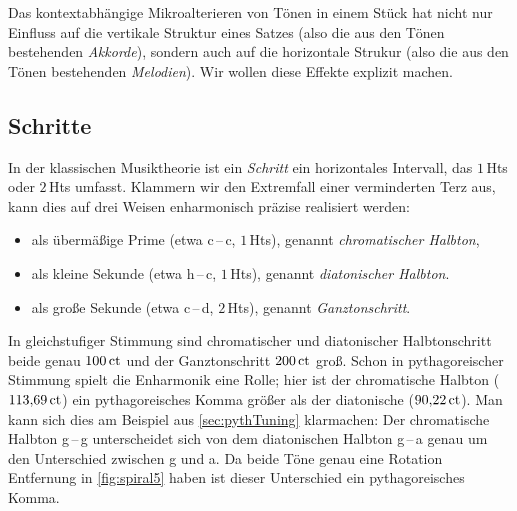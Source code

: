 Das kontextabhängige Mikroalterieren von Tönen in einem Stück hat nicht nur
Einfluss auf die vertikale Struktur eines Satzes (also die aus den Tönen
bestehenden \emph{Akkorde}), sondern auch auf die horizontale Strukur (also die
aus den Tönen bestehenden \emph{Melodien}). Wir wollen diese Effekte explizit
machen.

\subsection{Schritte}
\label{sec:steps}

In der klassischen Musiktheorie ist ein \emph{Schritt} ein horizontales
Intervall, das $1$\,Hts oder $2$\,Hts umfasst.  Klammern wir den Extremfall einer verminderten Terz aus, kann
dies auf drei Weisen enharmonisch präzise realisiert werden:
\begin{itemize}[itemsep=0em]
\item als übermäßige Prime (etwa c\,–\,\sharp c, $1$\,Hts), genannt
  \emph{chromatischer Halbton},
\item als kleine Sekunde (etwa h\,–\,c, $1$\,Hts), genannt
  \emph{diatonischer Halbton}.
\item als große Sekunde (etwa c\,–\,d, $2$\,Hts), genannt
  \emph{Ganztonschritt}.
\end{itemize}
In gleichstufiger Stimmung sind chromatischer und diatonischer Halbtonschritt
beide genau $100\,\text{ct}$ und der Ganztonschritt $200\,\text{ct}$ groß.  Schon in
pythagoreischer Stimmung spielt die Enharmonik eine Rolle; hier ist der
chromatische Halbton ($113{,}69\,\text{ct}$) ein pythagoreisches Komma größer als der
diatonische ($90{,}22\,\text{ct}$). Man kann sich dies am Beispiel aus
\cref{sec:pythTuning} klarmachen: Der chromatische Halbton g\,–\,\sharp g
unterscheidet sich von dem diatonischen Halbton g\,–\,\flat a genau um den
Unterschied zwischen \sharp g und \flat a. Da beide Töne genau eine Rotation
Entfernung in \cref{fig:spiral5} haben ist dieser Unterschied ein
pythagoreisches Komma.

